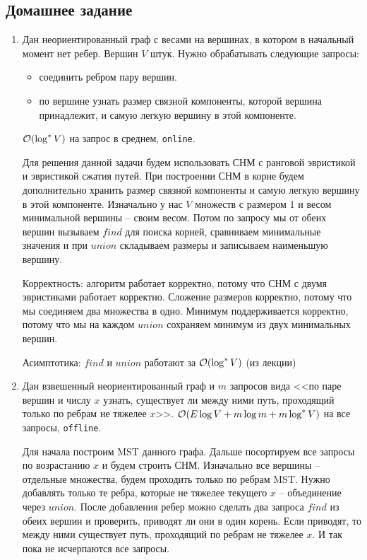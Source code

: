 \subsection{Домашнее задание}
\begin{enumerate}

  \item
    Дан неориентированный граф с весами на вершинах, в котором в начальный момент нет ребер.
    Вершин $V$ штук. Нужно обрабатывать следующие запросы:
    \begin{itemize}
      \item соединить ребром пару вершин.
      \item по вершине узнать размер связной компоненты, которой вершина принадлежит, и самую
            легкую вершину в этой компоненте.
    \end{itemize}
    $\mathcal{O}(\log^* V)$ на запрос в среднем, \texttt{online}.

    \begin{solution}
      Для решения данной задачи будем использовать СНМ с ранговой эвристикой и эвристикой сжатия путей. При построении СНМ в корне будем дополнительно хранить размер связной компоненты и самую легкую вершину в этой компоненте. Изначально у нас $V$ множеств с размером 1 и весом минимальной вершины -- своим весом. Потом по запросу мы от обеих вершин вызываем $find$ для поиска корней, сравниваем минимальные значения и при $union$ складываем размеры и записываем наименьшую вершину.

      Корректность: алгоритм работает корректно, потому что СНМ с двумя эвристиками работает корректно. Сложение размеров корректно, потому что мы соединяем два множества в одно. Минимум поддерживается корректно, потому что мы на каждом $union$ сохраняем минимум из двух минимальных вершин.

      Асимптотика: $find$ и $union$ работают за $\mathcal{O}(\log^* V)$ (из лекции)
    \end{solution}

  \item
    Дан взвешенный неориентированный граф и $m$ запросов вида <<по паре вершин и числу $x$ узнать,
    существует ли между ними путь, проходящий только по ребрам не тяжелее $x$>>.
    $\mathcal{O}(E \log V + m \log m + m \log^* V)$ на все запросы,  \texttt{offline}.

    \begin{solution}
      Для начала построим MST данного графа. Дальше посортируем все запросы по возрастанию $x$ и будем строить СНМ. Изначально все вершины -- отдельные множества, будем проходить только по ребрам MST. Нужно добавлять только те ребра, которые не тяжелее текущего $x$ -- объединение через $union$. После добавления ребер можно сделать два запроса $find$ из обеих вершин и проверить, приводят ли они в один корень. Если приводят, то между ними существует путь, проходящий по ребрам не тяжелее $x$. И так пока не исчерпаются все запросы.


\end{solution}
\end{enumerate}
